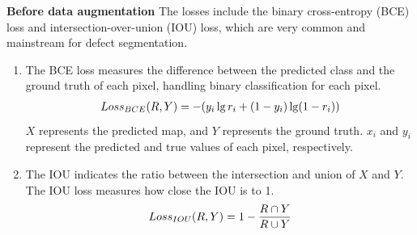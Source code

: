 \documentclass[sn-mathphys]{sn-jnl}%
\theoremstyle{thmstyleone}%
\theoremstyle{thmstyletwo}%
\theoremstyle{thmstylethree}%
\begin{document}
\textbf{Before data augmentation} The losses include the binary cross-entropy (BCE) loss and intersection-over-union (IOU) loss, which are very common and mainstream for defect segmentation.
\begin{enumerate}[]
\item The BCE loss measures the difference between the predicted class and the ground truth of each pixel, handling binary classification for each pixel.
\begin{equation}
\centering
\begin{split}
Loss_{BCE}(R,Y) = - (y_i\lg r_i + (1-y_i)\lg (1-r_i) )
\label{eq:3.3.8}
\end{split}
\end{equation}
$X$ represents the predicted map, and $Y$ represents the ground truth. $x_i$ and $y_i$ represent the predicted and true values of each pixel, respectively.

\item The IOU indicates the ratio between the intersection and union of $X$ and $Y$. The IOU loss measures how close the IOU is to 1. 
\begin{equation}
\centering
\begin{split}
Loss_{IOU}(R,Y) = 1 - \frac{R \cap Y}{R \cup Y}
\label{eq:3.3.8}
\end{split}
\end{equation}
\end{enumerate}
\end{document}
